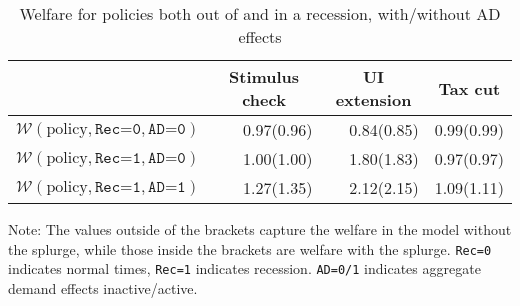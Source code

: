 \documentclass{econsocart}
\begin{document}
\begin{table}[tb] 
  \caption{Welfare for policies both out of and in a recession, with/without AD effects}
  \label{tab:welfare6-SplurgeComp} 
  \centering

  \begin{tabular*}
    {\textwidth}{@{\extracolsep{\fill}}lrrr@{}} 
    \hline
    & \multicolumn{1}{c}{Stimulus check} & \multicolumn{1}{c}{UI extension} & \multicolumn{1}{c}{Tax cut} \\ \hline
    $\mathcal{W}(\text{policy}, \texttt{Rec=0}, \texttt{AD=0})$ & 0.97(0.96) & 0.84(0.85) & 0.99(0.99) \\
    \addlinespace
    $\mathcal{W}(\text{policy}, \texttt{Rec=1}, \texttt{AD=0})$ & 1.00(1.00) & 1.80(1.83) & 0.97(0.97) \\
    $\mathcal{W}(\text{policy}, \texttt{Rec=1}, \texttt{AD=1})$ & 1.27(1.35) & 2.12(2.15) & 1.09(1.11) \\
    \hline
  \end{tabular*}

  \noindent\parbox{\textwidth}{
    \medskip
    \footnotesize Note: The values outside of the brackets capture the welfare in the model without the splurge, while those inside the brackets are welfare with the splurge. \texttt{Rec=0} indicates normal times, \texttt{Rec=1} indicates recession. \texttt{AD=0/1} indicates aggregate demand effects inactive/active.
  }
\end{table}

\vspace{0.5em}
\end{document}

